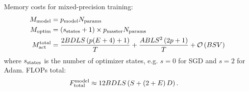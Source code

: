 \documentclass[11pt]{article}
\begin{document}
Memory costs for mixed-precision training:
\begin{align}
	M _{ {\rm model} }                   & =p _{ {\rm model} } N _{ {\rm params} } \nonumber\\
	M _{ {\rm optim} }                   & =  \left ( s _{ {\rm states} }+1 \right) \times p _{ {\rm master } } N _{ {\rm params} } \nonumber\\
	M _{ {\rm act}  } ^{ {\rm  total}  } & =\frac{ 2BDLS   \left ( p(E+4) + 1   \right ) }{ T }
	+ \frac{ ABLS ^{ 2 } \left ( 2p+1\right ) }{ T }  + \mathcal{O} \left( BSV \right)
\end{align}
where $ s _{ {\rm  states} } $ is the number of optimizer states, e.g. $ s=0 $ for SGD and $ s=2 $
for Adam. FLOPs total:
\begin{align}
	F _{ {\rm total}  } ^{ {\rm  model}  } & \approx 12 BDLS \left ( S + \left ( 2+E \right )D \right ) .
\end{align}






\end{document}
